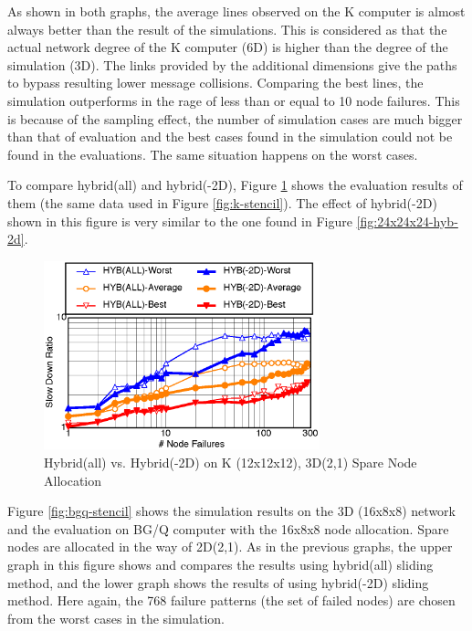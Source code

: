 \documentclass[Afour,times,sageh]{sagej}
\begin{document}
As shown in both graphs, the average lines observed on the K computer
is almost always better than the result of the simulations. This is
considered as that the actual network degree of the K computer (6D) is
higher than the degree of the simulation (3D). The links provided by
the additional dimensions give the paths to bypass resulting lower
message collisions. Comparing the best lines, the simulation
outperforms in the rage of less than or equal to 10 node
failures. This is because of the sampling effect, the number of
simulation cases are much bigger than that of evaluation and the best
cases found in the simulation could not be found in the
evaluations. The same situation happens on the worst cases.

To compare hybrid(all) and hybrid(-2D), Figure \ref{fig:k-comparison}
shows the evaluation results of them (the same data used in Figure
\ref{fig:k-stencil}). The effect of hybrid(-2D) shown in this figure
is very similar to the one found in Figure \ref{fig:24x24x24-hyb-2d}.

\begin{figure}[ht]
\centering
\includegraphics[width=80mm]{Figs/K-comparison-CL.eps}
  \caption{Hybrid(all) vs. Hybrid(-2D) on K (12x12x12), 3D(2,1) Spare Node
    Allocation}
  \label{fig:k-comparison}
\end{figure}

Figure \ref{fig:bgq-stencil} shows the simulation results on the
3D (16x8x8) network and the evaluation on BG/Q computer with the 16x8x8
node allocation. Spare nodes are allocated in the way of
2D(2,1). As in the previous graphs, the upper graph in this figure
shows and compares the results using hybrid(all) sliding method, and
the lower graph shows the results of using hybrid(-2D) sliding
method. Here again, the 768 failure patterns (the set of failed nodes)
are chosen from the worst cases in the simulation.
\end{document}
